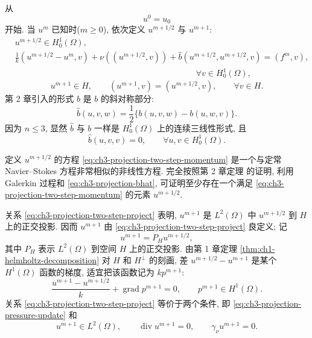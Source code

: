 从
\begin{equation}
u^0=u_0
\label{eq:ch3-projection-two-step-initial}
\end{equation}
开始. 当 $u^m$ 已知时($m\geq0$), 依次定义 $u^{m+1/2}$ 与 $u^{m+1}$:
\begin{equation}
\begin{aligned}
&u^{m+1/2}\in H_0^1(\Omega),\\
&\frac1k(u^{m+1/2}-u^m,v)+\nu((u^{m+1/2},v))
+\widehat b(u^{m+1/2},u^{m+1/2},v)
=(f^m,v),\\
&\hspace{9cm}\forall v\in H_0^1(\Omega),
\end{aligned}
\label{eq:ch3-projection-two-step-momentum}
\end{equation}
\begin{equation}
u^{m+1}\in H,\qquad
(u^{m+1},v)=(u^{m+1/2},v),\qquad\forall v\in H.
\label{eq:ch3-projection-two-step-project}
\end{equation}
第 2 章引入的形式 $\widehat b$ 是 $b$ 的斜对称部分:
\begin{equation}
\widehat b(u,v,w)=\frac12\{b(u,v,w)-b(u,w,v)\}.
\label{eq:ch3-projection-bhat}
\end{equation}
因为 $n\leq3$, 显然 $\widehat b$ 与 $b$ 一样是 $H_0^1(\Omega)$ 上的连续三线性形式, 且
\begin{equation}
\widehat b(u,v,v)=0,\qquad\forall u,v\in H_0^1(\Omega).
\label{eq:ch3-projection-bhat-cancellation}
\end{equation}

\hypertarget{chapter-03-page-284}{}
定义 $u^{m+1/2}$ 的方程 \eqref{eq:ch3-projection-two-step-momentum} 是一个与定常 Navier--Stokes 方程非常相似的非线性方程. 完全按照第 2 章定理  的证明, 利用 Galerkin 过程和 \eqref{eq:ch3-projection-bhat}, 可证明至少存在一个满足 \eqref{eq:ch3-projection-two-step-momentum} 的元素 $u^{m+1/2}$.

关系 \eqref{eq:ch3-projection-two-step-project} 表明, $u^{m+1}$ 是 $L^2(\Omega)$ 中 $u^{m+1/2}$ 到 $H$ 上的正交投影. 因而 $u^{m+1}$ 由 \eqref{eq:ch3-projection-two-step-project} 良定义; 记
\begin{equation}
u^{m+1}=P_Hu^{m+1/2},
\label{eq:ch3-projection-ph}
\end{equation}
其中 $P_H$ 表示 $L^2(\Omega)$ 到空间 $H$ 上的正交投影. 由第 1 章定理 \ref{thm:ch1-helmholtz-decomposition} 对 $H$ 和 $H^\perp$ 的刻画, 差 $u^{m+1/2}-u^{m+1}$ 是某个 $H^1(\Omega)$ 函数的梯度, 适宜把该函数记为 $kp^{m+1}$:
\begin{equation}
\frac{u^{m+1}-u^{m+1/2}}{k}+\operatorname{grad}p^{m+1}=0,
\qquad p^{m+1}\in H^1(\Omega).
\label{eq:ch3-projection-pressure-update}
\end{equation}
关系 \eqref{eq:ch3-projection-two-step-project} 等价于两个条件, 即 \eqref{eq:ch3-projection-pressure-update} 和
\begin{equation}
u^{m+1}\in L^2(\Omega),\qquad
\operatorname{div}u^{m+1}=0,\qquad
\gamma_\nu u^{m+1}=0.
\label{eq:ch3-projection-divergence-boundary}
\end{equation}

